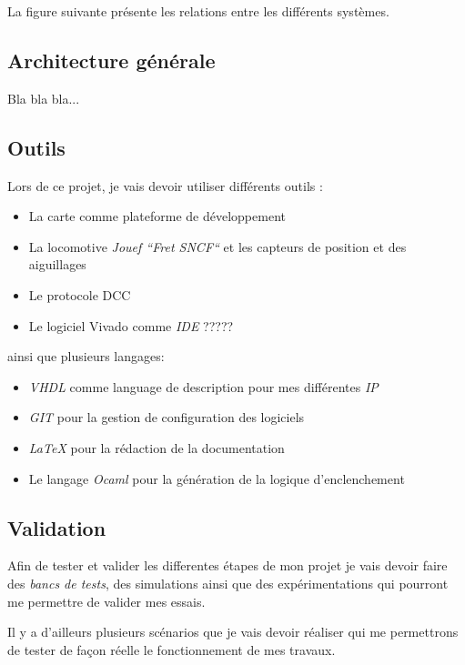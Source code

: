 La figure suivante présente les relations entre les différents
systèmes.


\subsection{Architecture générale}
\label{sec:archi}
Bla bla bla...



\subsection{Outils}
\label{sec:outils}

Lors de ce projet, je vais devoir utiliser différents outils :
\begin{itemize}
  \item La carte \crt comme plateforme de développement
  \item La locomotive \emph{Jouef ``Fret SNCF``}\cite{Jouef}  et les capteurs de
    position et des aiguillages
  \item Le protocole DCC \cite{DCC}
  \item Le logiciel Vivado comme \emph{IDE} ?????
\end{itemize}

ainsi que plusieurs langages:
\begin{itemize}
  \item \emph{VHDL}\cite{VHDL} comme language de description pour mes différentes
    \emph{IP}
  \item \emph{GIT}\cite{GIT} pour la gestion de configuration des logiciels
  \item \emph{\LaTeX}\cite{LATEX} pour la rédaction de la documentation
  \item Le langage \emph{Ocaml}\cite{OCAML} pour la génération de la logique d'enclenchement
\end{itemize}


\subsection{Validation}
\label{sec:valid}

Afin de tester et valider les differentes étapes de mon projet je vais
devoir faire des \emph{bancs de tests}, des simulations ainsi que des
expérimentations qui pourront me permettre de valider mes essais.

Il y a d'ailleurs plusieurs scénarios que je vais devoir réaliser qui
me permettrons de tester de façon réelle le fonctionnement de mes travaux.

